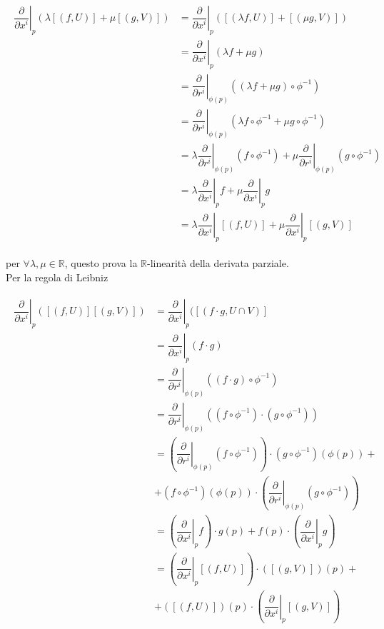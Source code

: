 \begin{align}
	\begin{split}
		\left. \dfrac{\partial}{\partial x^{i}} \right|_{p} (\lambda [(f,U)] + \mu [(g,V)]) &= \left. \dfrac{\partial}{\partial x^{i}} \right|_{p} ([(\lambda f,U)] + [(\mu g,V)])\\
		&= \left. \dfrac{\partial}{\partial x^{i}} \right|_{p} (\lambda f + \mu g)\\
		&= \left. \dfrac{\partial}{\partial r^{i}} \right|_{\phi(p)} ((\lambda f + \mu g) \circ \phi^{-1})\\
		&= \left. \dfrac{\partial}{\partial r^{i}} \right|_{\phi(p)} (\lambda f \circ \phi^{-1} + \mu g \circ \phi^{-1})\\
		&= \lambda \left. \dfrac{\partial}{\partial r^{i}} \right|_{\phi(p)} (f \circ \phi^{-1}) + \mu \left. \dfrac{\partial}{\partial r^{i}} \right|_{\phi(p)} (g \circ \phi^{-1})\\
		&= \lambda \left. \dfrac{\partial}{\partial x^{i}} \right|_{p} f + \mu \left. \dfrac{\partial}{\partial x^{i}} \right|_{p} g\\
		&= \lambda \left. \dfrac{\partial}{\partial x^{i}} \right|_{p} [(f,U)] + \mu \left. \dfrac{\partial}{\partial x^{i}} \right|_{p} [(g,V)]
	\end{split}
\end{align}

per $ \forall \lambda,\mu \in \mathbb{R} $, questo prova la $ \mathbb{R} $-linearità della derivata parziale.\\
Per la regola di Leibniz

\begin{align}
	\begin{split}
		\left. \dfrac{\partial}{\partial x^{i}} \right|_{p} ([(f,U)] [(g,V)]) &= \left. \dfrac{\partial}{\partial x^{i}} \right|_{p} ([(f \cdot g,U \cap V)]\\
		&= \left. \dfrac{\partial}{\partial x^{i}} \right|_{p} (f \cdot g)\\
		&= \left. \dfrac{\partial}{\partial r^{i}} \right|_{\phi(p)} ((f \cdot g) \circ \phi^{-1})\\
		&= \left. \dfrac{\partial}{\partial r^{i}} \right|_{\phi(p)} ((f \circ \phi^{-1}) \cdot (g \circ \phi^{-1}))\\
		&= \left( \left. \dfrac{\partial}{\partial r^{i}} \right|_{\phi(p)} (f \circ \phi^{-1}) \right) \cdot (g \circ \phi^{-1})(\phi(p)) +\\
		&+ (f \circ \phi^{-1})(\phi(p)) \cdot \left( \left. \dfrac{\partial}{\partial r^{i}} \right|_{\phi(p)} (g \circ \phi^{-1}) \right)\\
		&= \left( \left. \dfrac{\partial}{\partial x^{i}} \right|_{p} f \right) \cdot g(p) + f(p) \cdot \left( \left. \dfrac{\partial}{\partial x^{i}} \right|_{p} g \right)\\
		&= \left( \left. \dfrac{\partial}{\partial x^{i}} \right|_{p} [(f,U)] \right) \cdot ([(g,V)])(p) +\\
		&+ ([(f,U)])(p) \cdot \left( \left. \dfrac{\partial}{\partial x^{i}} \right|_{p} [(g,V)] \right)
	\end{split}
\end{align}

